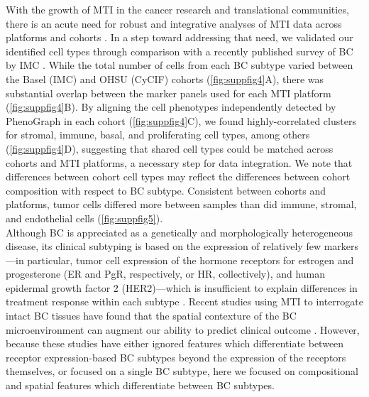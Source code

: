 \documentclass[preprint,review,3p,12pt]{elsarticle}
\begin{document}
With the growth of MTI in the cancer research and translational communities, there is an acute need for robust and integrative analyses of MTI data across platforms and cohorts \cite{htan2020}. In a step toward addressing that need, we validated our identified cell types through comparison with a recently published survey of BC by IMC \cite{jackson_single-cell_2020}. While the total number of cells from each BC subtype varied between the Basel (IMC) and OHSU (CyCIF) cohorts (\autoref{fig:suppfig4}A), there was substantial overlap between the marker panels used for each MTI platform (\autoref{fig:suppfig4}B). By aligning the cell phenotypes independently detected by PhenoGraph in each cohort (\autoref{fig:suppfig4}C), we found highly-correlated clusters for stromal, immune, basal, and proliferating cell types, among others (\autoref{fig:suppfig4}D), suggesting that shared cell types could be matched across cohorts and MTI platforms, a necessary step for data integration. We note that differences between cohort cell types may reflect the differences between cohort composition with respect to BC subtype. Consistent between cohorts and platforms, tumor cells differed more between samples than did immune, stromal, and endothelial cells (\autoref{fig:suppfig5}). \\

Although BC is appreciated as a genetically and morphologically heterogeneous disease, its clinical subtyping is based on the expression of relatively few markers—in particular, tumor cell expression of the hormone receptors for estrogen and progesterone (ER and PgR, respectively, or HR, collectively), and human epidermal growth factor 2 (HER2)—which is insufficient to explain differences in treatment response within each subtype \cite{bcreview2015}. Recent studies using MTI to interrogate intact BC tissues have found that the spatial contexture of the BC microenvironment can augment our ability to predict clinical outcome \cite{jackson_single-cell_2020,keren2018}. However, because these studies have either ignored features which differentiate between receptor expression-based BC subtypes beyond the expression of the receptors themselves, or focused on a single BC subtype, here we focused on compositional and spatial features which differentiate between BC subtypes. \\
\end{document}
